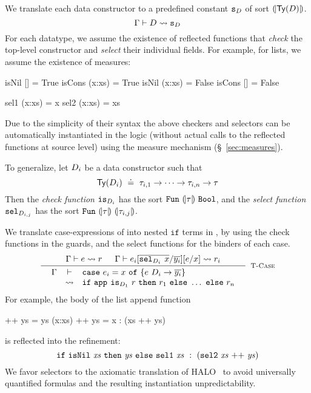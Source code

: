 %
We translate each data constructor to a
predefined \smtlan constant ${\texttt{s}_{D}}$ of
sort ${(\!|\mathsf{Ty}({D})|\!)}$.
$$
	 \Gamma\vdash D \rightsquigarrow \texttt{s}_{D} 
$$
%
For each datatype, we assume the existence of reflected functions that
\emph{check} the top-level constructor
and \emph{select} their individual fields.
%
For example, for lists, we assume the existence of measures:
%
\begin{mcode}
  isNil []     = True     isCons (x:xs) = True
  isNil (x:xs) = False    isCons []     = False

  sel1 (x:xs)  = x        sel2 (x:xs)   = xs
\end{mcode}
%
Due to the simplicity of their syntax the above checkers and selectors
can be automatically instantiated in the logic
(\ie without actual calls to the reflected functions at source level)
using the measure mechanism (\S~\ref{sec:measures}).

To generalize, let $D_i$ be a data constructor such that
$$
\mathsf{Ty}({D_i}) \ \doteq\  \tau_{i,1} \rightarrow \dots \rightarrow \tau_{i,n} \rightarrow \tau
$$
Then the \emph{check function}
${\texttt{is}_{{D_i}}}$ has the sort
$\mathtt{Fun}\ {(\!|\tau|\!)}\ {\texttt{Bool}}$,
and the \emph{select function}
${\texttt{sel}_{{D}_{i,j}}}$ has the sort
$\mathtt{Fun}\ {(\!|\tau|\!)}\ {(\!|\tau_{i,j}|\!)}$.
%


%
We translate case-expressions
of \corelan into nested $\mathtt{if}$
terms in \smtlan, by using the check
functions in the guards, and the
select functions for the binders
of each case.
$$
\inference{
	\tologicshort{\env}{e}{\typ_e}{\pred}{\embed{\typ_e}}{\smtenv}{\axioms} &&
	\tologicshort{\env}{e_i\subst{\overline{y_i}}{\overline{\selector{\dc_i}{}\ x}}\subst{x}{e}}{\typ}{\pred_i}{\embed{\typ}}{\smtenv}{\axioms_i}
}{
	\tologicshorttwolines{\env}{\ecase{x}{e}{\dc_i}{\overline{y_i}}{e_i}}{\typ}
	 {\eif{\smtappname{}{}\ \checkdc{\dc_1}\ \pred}{\pred_1}{\ldots} \ \mathtt{else}\ \pred_n}{\embed{\typ}}{\smtenv}
	 {\andaxioms{\axioms}{\axioms_i}}
}[\lgcase]
$$
%
For example, the body of the list append function
%
\begin{code}
  []     ++ ys = ys
  (x:xs) ++ ys = x : (xs ++ ys)
\end{code}
%
is reflected into the \smtlan refinement:
%
$$
\ite{\mathtt{isNil}\ \mathit{xs}}
    {\mathit{ys}}
    {\mathtt{sel1}\ \mathit{xs}\
       \dcons\
       (\mathtt{sel2}\ \mathit{xs} \ \mathtt{++}\  \mathit{ys})}
$$
%
We favor selectors to the axiomatic translation of
HALO~\citep{halo} to avoid
universally quantified formulas and the resulting
instantiation unpredictability.


